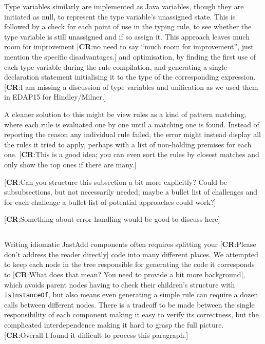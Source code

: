 \documentclass[nofilelist]{cslthse-msc}
\newcommand{\CR}[1]{\textcolor{green!60!black}{[\textbf{CR}:#1]}}
\begin{document}
Type variables similarly are implemented as Java variables, though they are initiated as null, to represent the type variable's unassigned state.
This is followed by a check for each point of use in the typing rule, to see whether the type variable is still unassigned and if so assign it.
This approach leaves much room for improvement \CR{no need to say ``much room for improvement'', just mention the specific disadvantages.} and optimisation, by finding the first use of each type variable during the rule compilation, and generating a single declaration statement initialising it to the type of the corresponding expression.
\CR{I am missing a discussion of type variables and unification as we used them in EDAP15 for Hindley/Milner.}

A cleaner solution to this might be view rules as a kind of pattern matching, where each rule is evaluated one by one until a matching one is found.
Instead of reporting the reason any individual rule failed, the error might instead display all the rules it tried to apply, perhaps with a list of non-holding premises for each one.
\CR{This is a good idea; you can even sort the rules by closest matches and only show the top ones if there are many.}

\CR{Can you structure this subsection a bit more explicitly?  Could be subsubsections, but not necessarily needed; maybe a bullet list of
challenges and for each challenge a bullet list of potential approaches could work?}

\CR{Something about error handling would be good to discuss here}

\subsection{\rqthree}
Writing idiomatic JastAdd components often requires splitting your \CR{Please don't address the reader directly}  code into many different places.
We attempted to keep each node in the tree responsible for generating the code it corresponds to \CR{What does that mean?  You need to provide a bit more background}, which avoids parent nodes having to check their children's structure with \verb|isInstanceOf|, but also means even generating a simple rule can require a dozen calls between different nodes.
There is a tradeoff to be made between the single responsibility of each component making it easy to verify its correctness, but the complicated interdependence making it hard to grasp the full picture.
\CR{Overall I found it difficult to process this paragraph.}
\end{document}
